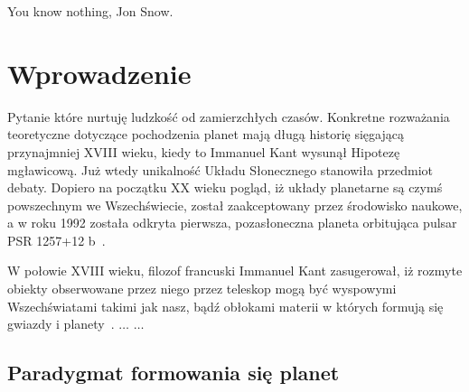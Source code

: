 \begin{savequote}[75mm]
   You know nothing, Jon Snow.
\end{savequote}

\chapter{Wprowadzenie}
 Pytanie które nurtuję ludzkość od
zamierzchłych czasów. Konkretne rozważania teoretyczne dotyczące pochodzenia
planet mają długą historię sięgającą przynajmniej XVIII wieku, kiedy to Immanuel
Kant wysunął \dq{}Hipotezę mgławicową\dq{}. Już wtedy unikalność Układu
Słonecznego stanowiła przedmiot debaty. Dopiero na początku XX wieku pogląd, iż
układy planetarne są czymś powszechnym we Wszechświecie, został zaakceptowany
przez środowisko naukowe, a w roku 1992 została odkryta pierwsza, pozasłoneczna
planeta orbitująca pulsar PSR 1257+12 b~\cite{1992Natur.355..145W}.

W połowie XVIII wieku, filozof francuski Immanuel Kant zasugerował, iż rozmyte
o\-biek\-ty obserwowane przez niego przez teleskop mogą być wyspowymi
Wszechświatami takimi jak nasz, bądź obłokami materii w których formują się
gwiazdy i planety~\cite{ImmanuelKant.etal:2008}. $\ldots$ $\ldots$


\section{Paradygmat formowania się planet}
